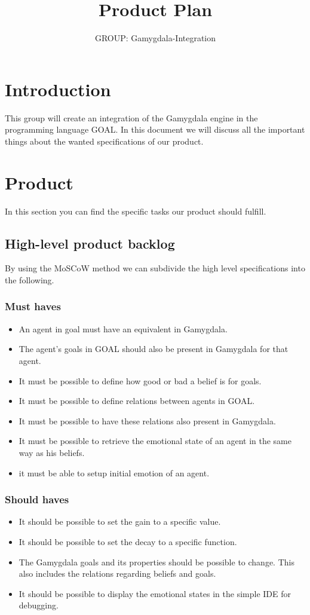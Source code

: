 \documentclass[]{article}
\title{Product Plan}
\author{GROUP: Gamygdala-Integration}
\begin{document}
\maketitle
\pagebreak
\tableofcontents
\pagebreak
\section{Introduction}
This group will create an integration of the \gls{Gamygdala} engine in the programming language \gls{GOAL}. In this document we will discuss all the important things about the wanted specifications of our product.
\section{Product}
In this section you can find the specific tasks our product should fulfill.
\subsection{High-level product backlog}
By using the \gls{MoSCoW} method we can subdivide the high level specifications into the following.
\subsubsection*{Must haves}
\begin{itemize}
	\item An \gls{agent} in goal must have an equivalent in Gamygdala.
	\item The agent's goals in GOAL should also be present in Gamygdala for that agent. 
	\item It must be possible to define how good or bad a belief is for goals.
	\item It must be possible to define relations between agents in GOAL.
	\item It must be possible to have these relations also present in Gamygdala.
	\item It must be possible to retrieve the emotional state of an agent in the same way as his beliefs.
	\item it must be able to setup initial emotion of an agent.
\end{itemize}
 
\subsubsection*{Should haves}

\begin{itemize}
	\item It should be possible to set the gain to a specific value.
	\item It should be possible to set the decay to a specific function.
	\item The  Gamygdala goals and its properties should be possible to change. This also includes the relations regarding beliefs and goals.
	\item It should be possible to display the emotional states in the simple IDE for debugging.
\end{itemize}
\end{document}
